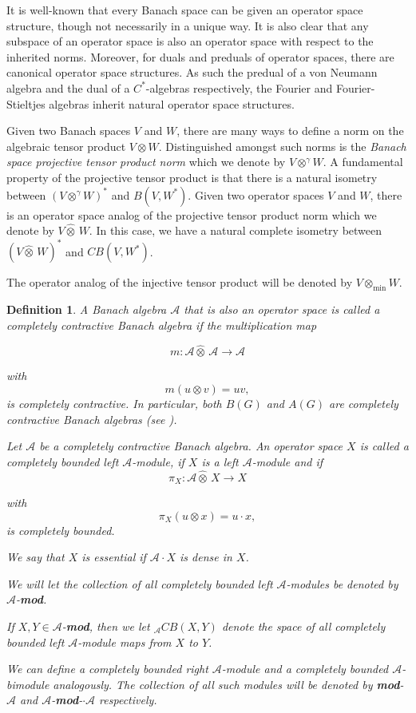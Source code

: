 \documentclass[10pt]{amsart}
\newtheorem{defn}[thm]{Definition}
\numberwithin{thm}{section}
\numberwithin{equation}{section}
\begin{document}
It is well-known that every Banach space can be given an operator 
space structure, though not necessarily in a unique way. It is also 
clear that any subspace of an operator space is also an operator space with respect to the inherited norms.
Moreover, for duals and preduals of operator spaces, there are canonical operator space structures.
As such the predual of a von Neumann algebra
and the dual of a $C^*$-algebras respectively, the Fourier and Fourier-Stieltjes algebras 
inherit natural operator space structures.  

Given two Banach spaces $V$ and $W$, there are many ways to define a norm on the 
algebraic tensor product $V\otimes W$. Distinguished amongst such norms is the \textit{Banach space 
projective tensor product norm} which we denote by $V\otimes ^\gamma W$. A fundamental property of 
the projective tensor product is that there is a natural isometry between $(V\otimes ^\gamma W)^*$ and 
$B(V,W^*)$. Given two operator spaces $V$ and $W$, there is an operator space analog of the projective
tensor product norm which we denote by $V\widehat{\otimes}\,W$. In this case, we have a natural 
complete isometry between $(V\widehat{\otimes}\,W)^*$ and $CB(V,W^*)$. 

The operator analog of the injective tensor product will be denoted by $V\otimes_{\min}W$. 

\begin{defn}

A Banach algebra $\mathcal{A}$ that is also an operator space is called a 
\textit{completely contractive Banach algebra} if the multiplication map 

\[m:\mathcal{A}\widehat{\otimes}\,\mathcal{A}\rightarrow \mathcal{A}\]

with 
\[m(u\otimes v)=uv,\]
is completely contractive. In particular, both $B(G)$ and $A(G)$ are 
completely contractive Banach algebras (see \cite{Eymard}).  

Let $\mathcal{A}$ be a completely contractive Banach algebra. An operator space $X$ is called a 
\textit{completely bounded left $\mathcal{A}$-module}, if $X$ is a left $\mathcal{A}$-module and if 
\[\pi _{X} :\mathcal{A}\widehat{\otimes}\, X\rightarrow X\]

with 
\[\pi _{X}(u\otimes x)=u\cdot x,\]
is completely bounded. 

We say that $X$ is \textit{essential} if $\mathcal{A}\cdot X$ is dense in $X$. 

We will let the collection of all completely bounded left $\mathcal{A}$-modules be denoted 
by $\mathcal{A}$-\textbf{mod}. 

If $X,Y\in \mathcal{A}$-\textbf{mod}, then we let $_{\mathcal{A}}CB(X,Y)$ denote the space of all 
completely bounded left $\mathcal{A}$-module maps from $X$ to $Y$. 

We can define a \textit{completely bounded right $\mathcal{A}$-module}
and a \textit{completely bounded $\mathcal{A}$-bimodule} analogously. The collection of all such modules
 will be denoted by \textbf{mod}-$\mathcal{A}$ and $\mathcal{A}$-\textbf{mod}-$\cdot \mathcal{A}$ respectively.

\end{defn}
\end{document}
